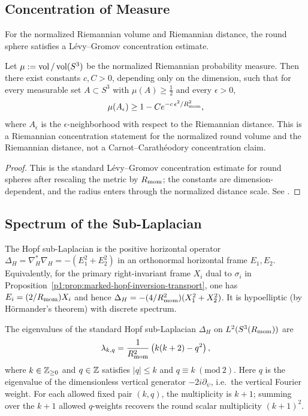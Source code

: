 \documentclass[11pt]{article}
\begin{document}
\subsection{Concentration of Measure}

For the normalized Riemannian volume and Riemannian distance, the round sphere satisfies a L\'evy--Gromov concentration estimate.

\begin{theorem}
\label{p1a:theorem:atlas-l-evy-gromov-concentration-on-the-round-3-sphe-59aa4cc}

Let \(\mu:=\operatorname{vol}/\operatorname{vol}(S^3)\) be the normalized Riemannian probability measure.
Then there exist constants \(c,C>0\), depending only on the dimension, such that
for every measurable set \(A \subset S^3\) with \(\mu(A) \ge \tfrac12\) and every \(\epsilon>0\),
\[
\mu(A_\epsilon) \ge 1 - C e^{-c\,\epsilon^2/R_{\mathrm{mom}}^2},
\]
where \(A_\epsilon\) is the \(\epsilon\)-neighborhood with respect to the Riemannian distance.
This is a Riemannian concentration statement for the normalized round volume and the Riemannian distance, not a Carnot--Carath\'eodory concentration claim.
\cite{ledoux2001concentration}
\end{theorem}

\begin{proof}
This is the standard L\'evy--Gromov concentration estimate for round spheres after rescaling the metric by \(R_{\mathrm{mom}}\); the constants are dimension-dependent, and the radius enters through the normalized distance scale. See \cite{ledoux2001concentration}.
\end{proof}


\subsection{Spectrum of the Sub-Laplacian}
\label{p1:subsec:sub-laplacian-spectrum}

The Hopf sub-Laplacian is the positive horizontal operator $\Delta_H=\nabla_H^*\nabla_H=-(E_1^2+E_2^2)$ in an orthonormal horizontal frame $E_1,E_2$. Equivalently, for the primary right-invariant frame $X_i$ dual to $\sigma_i$ in Proposition~\ref{p1:prop:marked-hopf-inversion-transport}, one has $E_i=(2/R_{\mathrm{mom}})X_i$ and hence $\Delta_H=-(4/R_{\mathrm{mom}}^2)(X_1^2+X_2^2)$. It is hypoelliptic (by Hörmander's theorem) with discrete spectrum.

\begin{theorem}
\label{p1a:theorem:atlas-spectral-resolution-8f48b6f}

The eigenvalues of the standard Hopf sub-Laplacian $\Delta_H$ on $L^2(S^3(R_{\mathrm{mom}}))$ are
\[
\lambda_{k,q} = \frac{1}{R_{\mathrm{mom}}^2}\left(k(k+2) - q^2\right),
\]
where \(k\in\mathbb{Z}_{\ge 0}\) and \(q\in\mathbb{Z}\) satisfies \(|q|\le k\) and \(q\equiv k \ (\mathrm{mod}\ 2)\).
Here \(q\) is the eigenvalue of the dimensionless vertical generator \(-2i\partial_\psi\), i.e.\ the vertical Fourier weight.  For each allowed fixed pair \((k,q)\), the multiplicity is \(k+1\); summing over the \(k+1\) allowed \(q\)-weights recovers the round scalar multiplicity \((k+1)^2\).
\cite{cowlingSikora2001su2}
\end{theorem}
\end{document}
